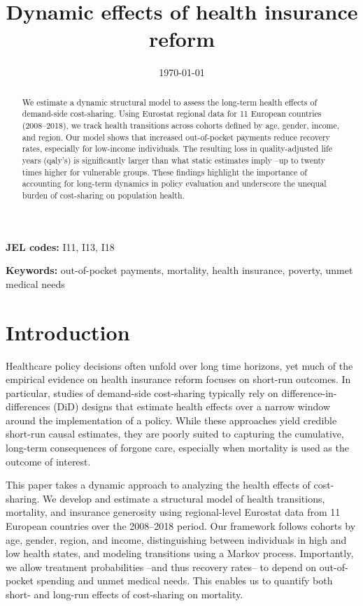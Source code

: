 \documentclass[a4paper,12pt]{article}
\date{\today}
\title{Dynamic effects of health insurance reform}
\begin{document}
\maketitle
\begin{abstract}
We estimate a dynamic structural model to assess the long-term health effects of demand-side cost-sharing. Using Eurostat regional data for 11 European countries (2008–2018), we track health transitions across cohorts defined by age, gender, income, and region. Our model shows that increased out-of-pocket payments reduce recovery rates, especially for low-income individuals. The resulting loss in quality-adjusted life years (qaly's) is significantly larger than what static estimates imply --up to twenty times higher for vulnerable groups. These findings highlight the importance of accounting for long-term dynamics in policy evaluation and underscore the unequal burden of cost-sharing on population health.
\end{abstract}


\textbf{JEL codes:} I11, I13, I18

\textbf{Keywords:} out-of-pocket payments, mortality, health insurance, poverty, unmet medical needs





\newpage
\section{Introduction}
\label{sec:org19f808d}


Healthcare policy decisions often unfold over long time horizons, yet much of the empirical evidence on health insurance reform focuses on short-run outcomes. In particular, studies of demand-side cost-sharing typically rely on difference-in-differences (DiD) designs that estimate health effects over a narrow window around the implementation of a policy. While these approaches yield credible short-run causal estimates, they are poorly suited to capturing the cumulative, long-term consequences of forgone care, especially when mortality is used as the outcome of interest.

This paper takes a dynamic approach to analyzing the health effects of cost-sharing. We develop and estimate a structural model of health transitions, mortality, and insurance generosity using regional-level Eurostat data from 11 European countries over the 2008–2018 period. Our framework follows cohorts by age, gender, region, and income, distinguishing between individuals in high and low health states, and modeling transitions using a Markov process. Importantly, we allow treatment probabilities --and thus recovery rates-- to depend on out-of-pocket spending and unmet medical needs. This enables us to quantify both short- and long-run effects of cost-sharing on mortality.
\end{document}
